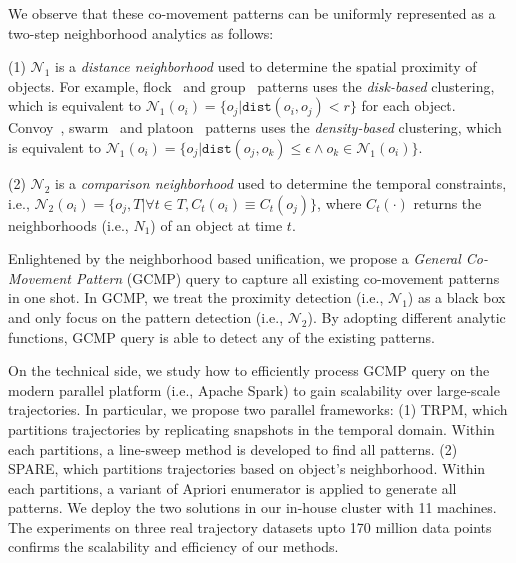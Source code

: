 We observe that these co-movement patterns can be uniformly represented as a two-step neighborhood analytics as follows:
	
	(1) $\mathcal{N}_1$ is a \emph{distance neighborhood} used to determine the spatial proximity of objects. For example,  flock~\cite{gudmundsson2006computing} and group~\cite{wang2006grouppattern} patterns uses the \emph{disk-based} clustering, which is equivalent to $\mathcal{N}_1(o_i)= \{o_j | \mathtt{dist}(o_i,o_j) < r \}$ for each object. Convoy~\cite{jeung2008discovery}, swarm~\cite{li2010swarm} and platoon~\cite{li2015platoon} patterns uses the \emph{density-based} clustering, which is equivalent to $\mathcal{N}_1(o_i)= \{o_j | \mathtt{dist}(o_j,o_k) \leq \epsilon \wedge o_k \in \mathcal{N}_1(o_i)\}$.
	
	(2) $\mathcal{N}_2$ is a \emph{comparison neighborhood} used to determine the temporal constraints, i.e., $\mathcal{N}_2(o_i)=\{o_j, T | \forall t \in T, C_t(o_i) \equiv C_t(o_j)\}$, where $C_t(\cdot)$ returns the neighborhoods (i.e., $N_1$) of an object at time $t$.

Enlightened by the neighborhood based unification, we propose a \emph{General Co-Movement Pattern} (GCMP)
query to capture all existing co-movement patterns in one shot. In GCMP, we treat the proximity detection (i.e., $\mathcal{N}_1$) as
a black box and only focus on the pattern detection (i.e., $\mathcal{N}_2$). By adopting different analytic functions, GCMP
query is able to detect any of the existing patterns.
%



On the technical side, we study how to efficiently process GCMP query 
on the modern parallel platform (i.e., Apache Spark) to
gain scalability over large-scale trajectories. 
In particular, we propose two parallel frameworks: (1) TRPM, which partitions trajectories by replicating snapshots in the temporal domain. Within each partitions, a line-sweep method is developed to find all patterns. 
(2) SPARE, which partitions trajectories based on object's neighborhood. Within each partitions, a variant of Apriori enumerator is applied to generate all patterns. 
We deploy the two solutions in our in-house cluster with 11 machines. The experiments on three
real trajectory datasets upto 170 million data points confirms the scalability and efficiency 
of our methods.
%
